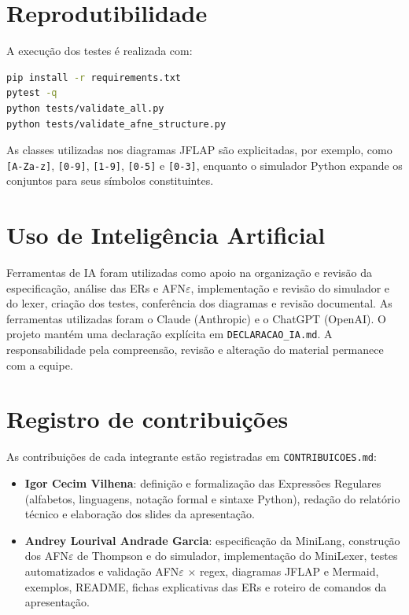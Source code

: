 \documentclass[12pt,a4paper,oneside]{report}
\begin{document}
\section{Reprodutibilidade}

A execução dos testes é realizada com:

\begin{lstlisting}[language=bash]
pip install -r requirements.txt
pytest -q
python tests/validate_all.py
python tests/validate_afne_structure.py
\end{lstlisting}

As classes utilizadas nos diagramas JFLAP são explicitadas, por exemplo, como \texttt{[A-Za-z]}, \texttt{[0-9]}, \texttt{[1-9]}, \texttt{[0-5]} e \texttt{[0-3]}, enquanto o simulador Python expande os conjuntos para seus símbolos constituintes.

\section{Uso de Inteligência Artificial}

Ferramentas de IA foram utilizadas como apoio na organização e revisão da especificação, análise das ERs e AFN$\varepsilon$, implementação e revisão do simulador e do lexer, criação dos testes, conferência dos diagramas e revisão documental. As ferramentas utilizadas foram o Claude (Anthropic) e o ChatGPT (OpenAI). O projeto mantém uma declaração explícita em \texttt{DECLARACAO\_IA.md}. A responsabilidade pela compreensão, revisão e alteração do material permanece com a equipe.

\section{Registro de contribuições}

As contribuições de cada integrante estão registradas em \texttt{CONTRIBUICOES.md}:

\begin{itemize}
\item \textbf{Igor Cecim Vilhena}: definição e formalização das Expressões Regulares (alfabetos, linguagens, notação formal e sintaxe Python), redação do relatório técnico e elaboração dos slides da apresentação.
\item \textbf{Andrey Lourival Andrade Garcia}: especificação da MiniLang, construção dos AFN$\varepsilon$ de Thompson e do simulador, implementação do MiniLexer, testes automatizados e validação AFN$\varepsilon$ $\times$ regex, diagramas JFLAP e Mermaid, exemplos, README, fichas explicativas das ERs e roteiro de comandos da apresentação.
\end{itemize}
\end{document}
